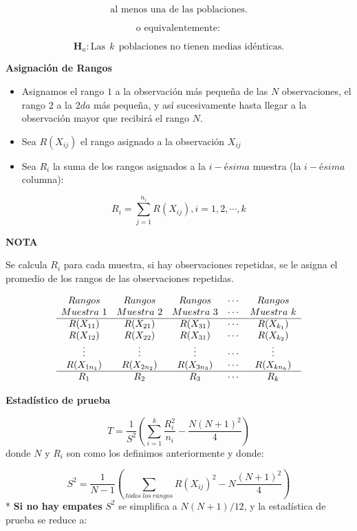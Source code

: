 \documentclass[
  a4paper,
  oneside,
  openany]{book}
\begin{document}
\[\mbox{al menos una de las poblaciones.}\]

\[\mbox{o equivalentemente}:\]

\[\textbf{H}_a: \mbox{Las} \ \ k \ \  \mbox{poblaciones no tienen medias idénticas.}\]

\textbf{Asignación de Rangos}

\begin{itemize}
\item
  Asignamos el rango \(1\) a la observación más pequeña de las \(N\) observaciones, el rango \(2\) a la \(2da\) más pequeña, y así sucesivamente hasta llegar a la observación mayor que recibirá el rango \(N\).
\item
  Sea \(R(X_{ij})\) el rango asignado a la observación \(X_{ij}\)
\item
  Sea \(R_{i}\) la suma de los rangos asignados a la \(i-ésima\) muestra (la \(i-ésima\) columna):
\end{itemize}

\[R_{i}=\sum_{j=1}^{n_{i}} R(X_{ij}),  i= 1, 2,\cdots,k\]

\textbf{NOTA}

Se calcula \(R_{i}\) para cada muestra, si hay observaciones repetidas, se le asigna el promedio de los rangos de las observaciones repetidas.

\[
\begin{array}{c c c c c} 
Rangos & Rangos & Rangos & \cdots  & Rangos \\
Muestra\ 1 & Muestra \ 2 & Muestra\ 3 & \cdots & Muestra\ k \\
\hline
R(X_{11}) &  R(X_{21}) & R(X_{31})  & \cdots & R(X_{k_{1}}) \\ 
R(X_{12}) &  R(X_{22}) & R(X_{31}) & \cdots & R(X_{k_{2}}) \\  
\vdots &  \vdots & \vdots  & \cdots &\vdots \\ 
R(X_{1n_{1}}) &R(X_{2n_{2}})   &R(X_{3n_{3}})   & \cdots &  R(X_{kn_{k}}) \\ 
\hline
R_{1} & R_{2} & R_{3} & \cdots&R_{k} \\
\end{array}
\]

\textbf{Estadístico de prueba}

\[T= \frac{1}{S^2}\left(\sum_{i=1}^{k}\frac{R^2_{i}}{n_{i}}-\frac{N(N+1)^2}{4}\right)\]
donde \(N\) y \(R_{i}\) son como los definimos anteriormente y donde:

\[ S^2 = \frac{1}{N-1}\left(\sum_{todos\ los\ rangos}R(X_{ij})^2-N\frac{(N+1)^2}{4}\right)\]
* \textbf{Si no hay empates} \(S^2\) se simplifica a \(N(N+1)/12\), y la estadística de prueba se reduce a:
\end{document}
